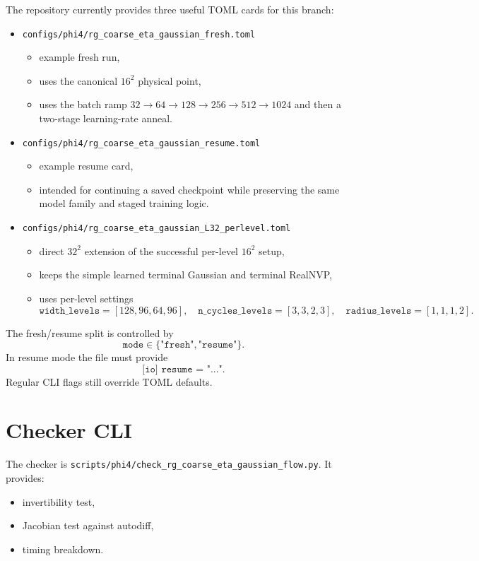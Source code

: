 \documentclass[11pt]{article}
\begin{document}
The repository currently provides three useful TOML cards for this branch:
\begin{itemize}
\item \texttt{configs/phi4/rg\_coarse\_eta\_gaussian\_fresh.toml}
\begin{itemize}
\item example fresh run,
\item uses the canonical $16^2$ physical point,
\item uses the batch ramp $32 \to 64 \to 128 \to 256 \to 512 \to 1024$ and
then a two-stage learning-rate anneal.
\end{itemize}
\item \texttt{configs/phi4/rg\_coarse\_eta\_gaussian\_resume.toml}
\begin{itemize}
\item example resume card,
\item intended for continuing a saved checkpoint while preserving the same
model family and staged training logic.
\end{itemize}
\item \texttt{configs/phi4/rg\_coarse\_eta\_gaussian\_L32\_perlevel.toml}
\begin{itemize}
\item direct $32^2$ extension of the successful per-level $16^2$ setup,
\item keeps the simple learned terminal Gaussian and terminal RealNVP,
\item uses per-level settings
\[
\texttt{width\_levels} = [128,96,64,96], \quad
\texttt{n\_cycles\_levels} = [3,3,2,3], \quad
\texttt{radius\_levels} = [1,1,1,2].
\]
\end{itemize}
\end{itemize}

The fresh/resume split is controlled by
\[
\texttt{mode} \in \{\texttt{"fresh"},\texttt{"resume"}\}.
\]
In resume mode the file must provide
\[
\texttt{[io] resume = "..."}.
\]
Regular CLI flags still override TOML defaults.

\section{Checker CLI}

The checker is
\texttt{scripts/phi4/check\_rg\_coarse\_eta\_gaussian\_flow.py}. It provides:
\begin{itemize}
\item invertibility test,
\item Jacobian test against autodiff,
\item timing breakdown.
\end{itemize}
\end{document}
